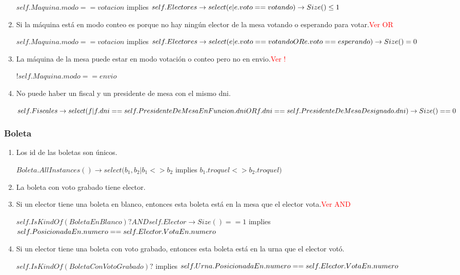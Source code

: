 \begin{enumerate}
$self.Maquina.modo == votacion$ implies $ \\
self.Electores \rightarrow select(e | e.voto == votando) \rightarrow Size() \leq 1$

\item Si la máquina está en modo conteo es porque no hay ningún elector de la mesa votando o esperando para votar.\textcolor{red}{Ver OR}

$self.Maquina.modo == votacion$ implies $ \\
self.Electores \rightarrow \\
select(e | e.voto == votando OR e.voto == esperando) \rightarrow Size() = 0$

\item La máquina de la mesa puede estar en modo votación o conteo pero no en envio.\textcolor{red}{Ver !}

$!self.Maquina.modo == envio$

\item No puede haber un fiscal y un presidente de mesa con el mismo dni.

$self.Fiscales \rightarrow \\
select(f | f.dni == self.PresidenteDeMesaEnFuncion.dni OR \\
f.dni == self.PresidenteDeMesaDesignado.dni) \rightarrow \\
Size() == 0 $


\end{enumerate}

\subsubsection*{Boleta}
\begin{enumerate}

\item Los id de las boletas son únicos.

$Boleta.AllInstances() \rightarrow select(b_1, b_2 | b_1 <> b_2 $ implies $ b_1.troquel <> b_2.troquel)$

\item La boleta con voto grabado tiene elector.


\item Si un elector tiene una boleta en blanco, entonces esta boleta está en la mesa que el elector vota.\textcolor{red}{Ver AND}

$self.IsKindOf(BoletaEnBlanco)? AND self.Elector \rightarrow Size() == 1 $ implies $\\
self.PosicionadaEn.numero == self.Elector.VotaEn.numero$

\item Si un elector tiene una boleta con voto grabado, entonces esta boleta está en la urna que el elector vot\'o.

$self.IsKindOf(BoletaConVotoGrabado)? $ implies $\\
self.Urna.PosicionadaEn.numero == self.Elector.VotaEn.numero$

\end{enumerate}


